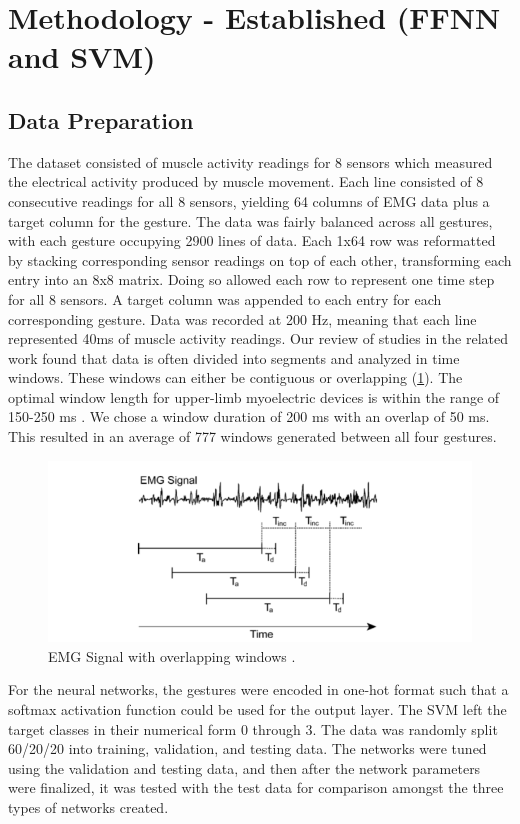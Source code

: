 \documentclass[journal]{IEEEtran}
\begin{document}
\section{Methodology - Established (FFNN and SVM)}
\label{sec:mat_met}

\subsection{Data Preparation}
\label{data_prep}
The dataset consisted of muscle activity readings for 8 sensors which measured the electrical activity produced by muscle movement. Each line consisted of 8 consecutive readings for all 8 sensors, yielding 64 columns of EMG data plus a target column for the gesture. The data was fairly balanced across all gestures, with each gesture occupying 2900 lines of data. Each 1x64 row was reformatted by stacking corresponding sensor readings on top of each other, transforming each entry into an 8x8 matrix. Doing so allowed each row to represent one time step for all 8 sensors. A target column was appended to each entry for each corresponding gesture. Data was recorded at 200 Hz, meaning that each line represented 40ms of muscle activity readings. Our review of studies in the related work found that data is often divided into segments and analyzed in time windows. These windows can either be contiguous or overlapping (\cref{fig:emg_overlap}). The optimal window length for upper-limb myoelectric devices is within the range of 150-250 ms \cite{englehart2003}. We chose a window duration of 200 ms with an overlap of 50 ms. This resulted in an average of 777 windows generated between all four gestures. 

\begin{figure}[b]
	\centering
	\includegraphics[width=0.92\linewidth]{EMG_Signal}
	\caption{EMG Signal with overlapping windows \cite{englehart2003}.}
	\label{fig:emg_overlap}
\end{figure}

For the neural networks, the gestures were encoded in one-hot format such that a softmax activation function could be used for the output layer. The SVM left the target classes in their numerical form 0 through 3. The data was randomly split 60/20/20 into training, validation, and testing data. The networks were tuned using the validation and testing data, and then after the network parameters were finalized, it was tested with the test data for comparison amongst the three types of networks created. 
\end{document}
